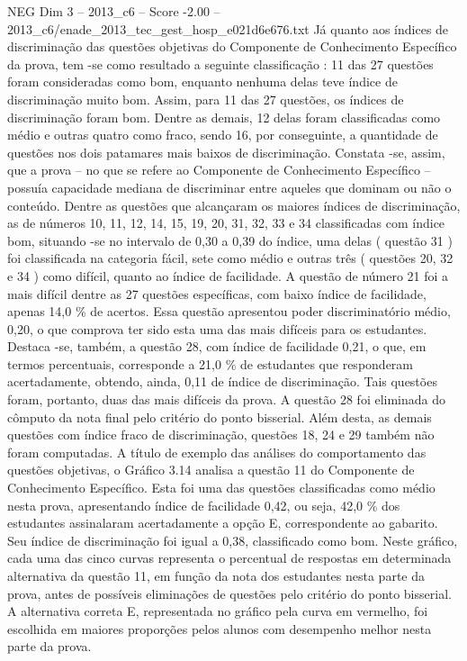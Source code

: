 \begin{textsample}{NEG Dim 3 – 2013\_c6 – Score -2.00 – 2013\_c6/enade\_2013\_tec\_gest\_hosp\_e021d6e676.txt}
Já quanto aos índices de discriminação das questões objetivas do Componente de Conhecimento Específico da prova, tem -se como resultado a seguinte classificação : 11 das 27 questões foram consideradas como bom, enquanto nenhuma delas teve índice de discriminação muito bom.
Assim, para 11 das 27 questões, os índices de discriminação foram bom.
Dentre as demais, 12 delas foram classificadas como médio e outras quatro como fraco, sendo 16, por conseguinte, a quantidade de questões nos dois patamares mais baixos de discriminação.
Constata -se, assim, que a prova – no que se refere ao Componente de Conhecimento Específico – possuía capacidade mediana de discriminar entre aqueles que dominam ou não o conteúdo.
Dentre as questões que alcançaram os maiores índices de discriminação, as de números 10, 11, 12, 14, 15, 19, 20, 31, 32, 33 e 34 classificadas com índice bom, situando -se no intervalo de 0,30 a 0,39 do índice, uma delas ( questão 31 ) foi classificada na categoria fácil, sete como médio e outras três ( questões 20, 32 e 34 ) como difícil, quanto ao índice de facilidade.
A questão de número 21 foi a mais difícil dentre as 27 questões específicas, com baixo índice de facilidade, apenas 14,0 \% de acertos.
Essa questão apresentou poder discriminatório médio, 0,20, o que comprova ter sido esta uma das mais difíceis para os estudantes.
Destaca -se, também, a questão 28, com índice de facilidade 0,21, o que, em termos percentuais, corresponde a 21,0 \% de estudantes que responderam acertadamente, obtendo, ainda, 0,11 de índice de discriminação.
Tais questões foram, portanto, duas das mais difíceis da prova.
A questão 28 foi eliminada do cômputo da nota final pelo critério do ponto bisserial.
Além desta, as demais questões com índice fraco de discriminação, questões 18, 24 e 29 também não foram computadas.
A título de exemplo das análises do comportamento das questões objetivas, o Gráfico 3.14 analisa a questão 11 do Componente de Conhecimento Específico.
Esta foi uma das questões classificadas como médio nesta prova, apresentando índice de facilidade 0,42, ou seja, 42,0 \% dos estudantes assinalaram acertadamente a opção E, correspondente ao gabarito.
Seu índice de discriminação foi igual a 0,38, classificado como bom.
Neste gráfico, cada uma das cinco curvas representa o percentual de respostas em determinada alternativa da questão 11, em função da nota dos estudantes nesta parte da prova, antes de possíveis eliminações de questões pelo critério do ponto bisserial.
A alternativa correta E, representada no gráfico pela curva em vermelho, foi escolhida em maiores proporções pelos alunos com desempenho melhor nesta parte da prova.

\end{textsample}
